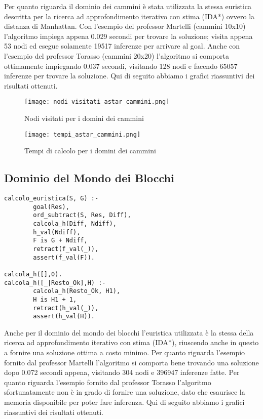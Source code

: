 Per quanto riguarda il dominio dei cammini è stata utilizzata la stessa euristica descritta per la ricerca ad approfondimento iterativo con stima (IDA*) ovvero la distanza di Manhattan. Con l'esempio del professor Martelli (cammini 10x10) l'algoritmo impiega appena 0.029 secondi per trovare la soluzione; visita appena 53 nodi ed esegue solamente 19517 inferenze per arrivare al goal. Anche con l'esempio del professor Torasso (cammini 20x20) l'algoritmo si comporta ottimamente impiegando 0.037 secondi, visitando 128 nodi e facendo 65057 inferenze per trovare la soluzione.
Qui di seguito abbiamo i grafici riassuntivi dei risultati ottenuti.

\begin{figure}[htp]
  \texttt{[image: nodi\_visitati\_astar\_cammini.png]}
  \caption{Nodi visitati per i domini dei cammini}
  \label{fig:figure13}
\end{figure}

\begin{figure}[htp]
  \texttt{[image: tempi\_astar\_cammini.png]}
  \caption{Tempi di calcolo per i domini dei cammini}
  \label{fig:figure14}
\end{figure}

\subsection{Dominio del Mondo dei Blocchi}

\begin{lstlisting}
calcolo_euristica(S, G) :-
        goal(Res),
        ord_subtract(S, Res, Diff),
        calcola_h(Diff, Ndiff),
        h_val(Ndiff),
        F is G + Ndiff,
        retract(f_val(_)),
        assert(f_val(F)).

calcola_h([],0).
calcola_h([_|Resto_Ok],H) :-
        calcola_h(Resto_Ok, H1),
        H is H1 + 1,
        retract(h_val(_)),
        assert(h_val(H)).
\end{lstlisting}

Anche per il dominio del mondo dei blocchi l'euristica utilizzata è la stessa della ricerca ad approfondimento iterativo con stima (IDA*), riuscendo anche in questo a fornire una soluzione ottima a costo minimo. Per quanto riguarda l'esempio fornito dal professor Martelli l'algoritmo si comporta bene trovando una soluzione dopo 0.072 secondi appena, visitando 304 nodi e 396947 inferenze fatte.
Per quanto riguarda l'esempio fornito dal professor Torasso l'algoritmo sfortunatamente non è in grado di fornire una soluzione, dato che esaurisce la memoria disponibile per poter fare inferenza.
Qui di seguito abbiamo i grafici riassuntivi dei risultati ottenuti.

